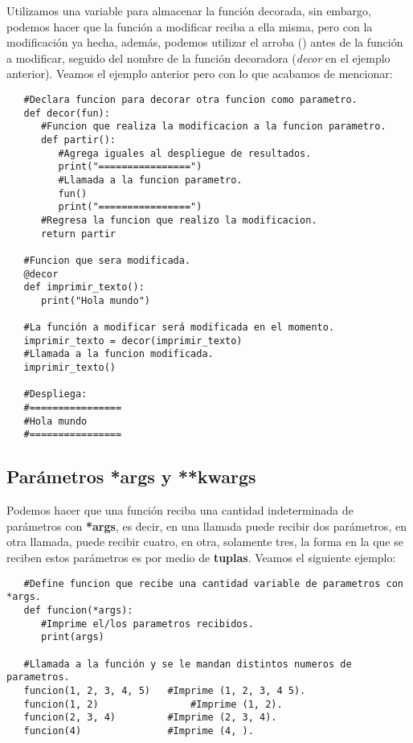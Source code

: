 Utilizamos una variable para almacenar la función decorada, sin embargo, podemos hacer que la función a modificar reciba a ella misma, pero con la modificación ya hecha, además, podemos utilizar el arroba (\@) antes de la función a modificar, seguido del nombre de la función decoradora (\textit{decor} en el ejemplo anterior). Veamos el ejemplo anterior pero con lo que acabamos de mencionar:
\begin{lstlisting}
   #Declara funcion para decorar otra funcion como parametro.
   def decor(fun):
      #Funcion que realiza la modificacion a la funcion parametro.
      def partir():
         #Agrega iguales al despliegue de resultados.
         print("================")
         #Llamada a la funcion parametro.
         fun()
         print("================")
      #Regresa la funcion que realizo la modificacion.
      return partir
      
   #Funcion que sera modificada.
   @decor
   def imprimir_texto():
      print("Hola mundo")
   
   #La función a modificar será modificada en el momento.
   imprimir_texto = decor(imprimir_texto)
   #Llamada a la funcion modificada.
   imprimir_texto()   
   
   #Despliega:
   #================
   #Hola mundo
   #================
\end{lstlisting}


\subsection{Parámetros *args y **kwargs}
\hspace{0.55cm}Podemos hacer que una función reciba una cantidad indeterminada de parámetros con \textbf{*args}, es decir, en una llamada puede recibir dos parámetros, en otra llamada, puede recibir cuatro, en otra, solamente tres, la forma en la que se reciben estos parámetros es por medio de \textbf{tuplas}. Veamos el siguiente ejemplo:
\begin{lstlisting}
   #Define funcion que recibe una cantidad variable de parametros con *args.
   def funcion(*args):
      #Imprime el/los parametros recibidos.
      print(args)
   
   #Llamada a la función y se le mandan distintos numeros de parametros.   
   funcion(1, 2, 3, 4, 5)	#Imprime (1, 2, 3, 4 5).
   funcion(1, 2)				#Imprime (1, 2).
   funcion(2, 3, 4)			#Imprime (2, 3, 4).
   funcion(4)				#Imprime (4, ).
\end{lstlisting}

